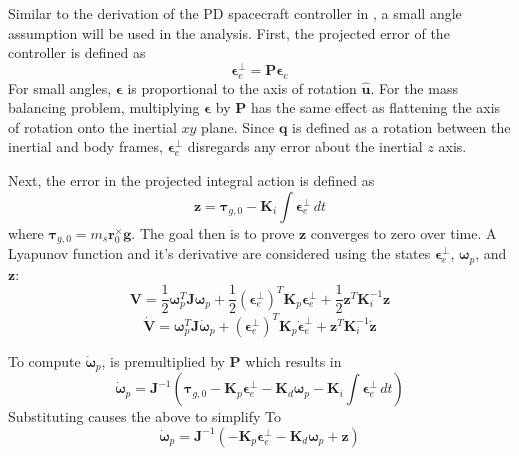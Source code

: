 Similar to the derivation of the PD spacecraft controller in , a small angle assumption will be used in the analysis. First, the projected error of the controller is defined as 
\begin{equation}
    \bm{\epsilon}_e^\perp = \bm{P}\bm{\epsilon}_e
\end{equation}
For small angles, $\bm{\epsilon}$ is proportional to the axis of rotation $\hat{\bm{u}}$. For the mass balancing problem, multiplying $\bm{\epsilon}$ by $\bm{P}$ has the same effect as flattening the axis of rotation onto the inertial $xy$ plane. Since $\bm{q}$ is defined as a rotation between the inertial and body frames, $\bm{\epsilon}_e^\perp$ disregards any error about the inertial $z$ axis.

Next, the error in the projected integral action is defined as 
\begin{equation}\label{equation:proj_int_action}
    \bm{z} = \bm{\tau}_{g,0}-\bm{K}_i\int\bm{\epsilon}_e^\perp\,dt
\end{equation}
where $\bm{\tau}_{g,0} = m_s\bm{r}_0^{\times}\bm{g}$. The goal then is to prove $\bm{z}$ converges to zero over time. A Lyapunov function and it's derivative are considered using the states $\bm{\epsilon}_e^\perp$, $\bm{\omega}_p$, and $\bm{z}$:
\begin{equation}
    \bm{V}=\frac{1}{2}\bm{\omega}_p^T\bm{J}\bm{\omega}_p
    +\frac{1}{2}(\bm{\epsilon}_e^\perp)^T\bm{K}_p\bm{\epsilon}_e^\perp
    +\frac{1}{2}\bm{z}^T\bm{K}_i^{-1}\bm{z}
\end{equation}
\begin{equation}
    \dot{\bm{V}}=\bm{\omega}_p^T\bm{J}\dot{\bm{\omega}}_p
    +(\bm{\epsilon}_e^\perp)^T\bm{K}_p\dot{\bm{\epsilon}}_e^\perp
    +\bm{z}^T\bm{K}_i^{-1}\dot{\bm{z}}
\end{equation}

To compute $\dot{\bm{\omega}}_p$,  is premultiplied by $\bm{P}$ which results in
\begin{equation}
    \dot{\bm{\omega}}_p = \bm{J}^{-1}(\bm{\tau}_{g,0}
        -\bm{K}_p\bm{\epsilon}_e^\perp - \bm{K}_d\bm{\omega}_p
         -\bm{K}_i\int\bm{\epsilon}_e^\perp\,dt)
\end{equation}
Substituting  causes the above to simplify To
\begin{equation}\label{equation:simplified_omega_p}
    \dot{\bm{\omega}}_p = \bm{J}^{-1}(
        -\bm{K}_p\bm{\epsilon}_e^\perp - \bm{K}_d\bm{\omega}_p
        +\bm{z})
\end{equation}


